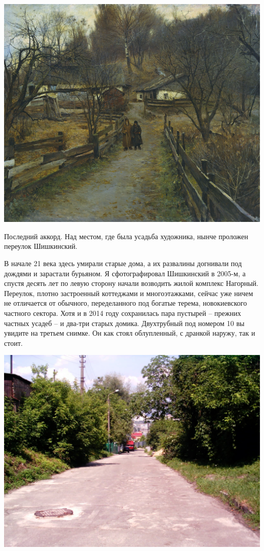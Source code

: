 \begin{center}
\includegraphics[width=\linewidth]{chast-kirvys/svetosl/sveto-osen-k-koncu-dnya.jpg}
\end{center}

Последний аккорд. Над местом, где была усадьба художника, нынче проложен переулок Шишкинский.

В начале 21 века здесь умирали старые дома, а их развалины догнивали под дождями и зарастали бурьяном. Я сфотографировал Шишкинский в 2005-м, а спустя десять лет по левую сторону начали возводить жилой комплекс Нагорный. Переулок, плотно застроенный коттеджами и многоэтажками, сейчас уже ничем не отличается от обычного, переделанного под богатые терема, новокиевского частного сектора. Хотя и в 2014 году сохранилась пара пустырей – прежних частных усадеб – и два-три старых домика. Двухтрубный под номером 10 вы увидите на третьем снимке. Он как стоял облупленный, с дранкой наружу, так и стоит.

\newpage
\vspace*{\fill}
\begin{center}
\includegraphics[width=\linewidth]{chast-kirvys/svetosl/shishk-imag0018.jpg}
\end{center}

